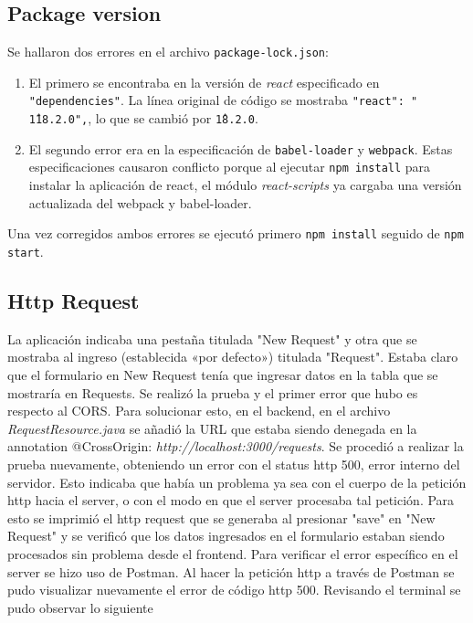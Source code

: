 \documentclass{article}
\begin{document}
	\subsection*{Package version}
	
	Se hallaron dos errores en el archivo \texttt{package-lock.json}:
	\begin{enumerate}
		\item El primero se encontraba en la versión de \emph{react} 
		especificado en \texttt{"dependencies"}. La línea original de código 
		se mostraba \texttt{"react": " \^118.2.0",}, lo que se cambió por 
		\texttt{\^18.2.0}.
		\item El segundo error era en la especificación de 
		\texttt{babel-loader} y \texttt{webpack}. Estas especificaciones 
		causaron conflicto porque al ejecutar \texttt{npm install} para 
		instalar la aplicación de react, el módulo 
		\emph{react-scripts} ya cargaba una versión actualizada del webpack 
		y babel-loader.
	\end{enumerate}
	
	Una vez corregidos ambos errores se ejecutó primero \texttt{npm 
	install} seguido de \texttt{npm start}.
	
	\subsection*{Http Request}
	
	La aplicación indicaba una pestaña titulada "New Request" y otra que se 
	mostraba al ingreso (establecida «por defecto») titulada "Request". 
	Estaba claro que el formulario en New Request tenía que ingresar datos 
	en la tabla que se mostraría en Requests. Se realizó la prueba y el 
	primer error que hubo es respecto al CORS. Para solucionar esto, en el 
	backend, en el archivo \emph{RequestResource.java} se añadió la URL que 
	estaba siendo denegada en la annotation @CrossOrigin: 
	\emph{http://localhost:3000/requests}. Se procedió a realizar la prueba 
	nuevamente, obteniendo un error con el status http 500, error interno 
	del servidor. Esto indicaba que había un problema ya sea con el cuerpo 
	de la petición http hacia el server, o con el modo en que el server 
	procesaba tal petición. Para esto se imprimió el http request que se 
	generaba al presionar "save" en "New Request" y se verificó que los 
	datos ingresados en el formulario estaban siendo procesados sin 
	problema desde el frontend. Para verificar el error específico en el 
	server se hizo uso de Postman. Al hacer la petición http a través de 
	Postman se pudo visualizar nuevamente el error de código http 500. 
	Revisando el terminal se pudo observar lo siguiente
	
\end{document}
